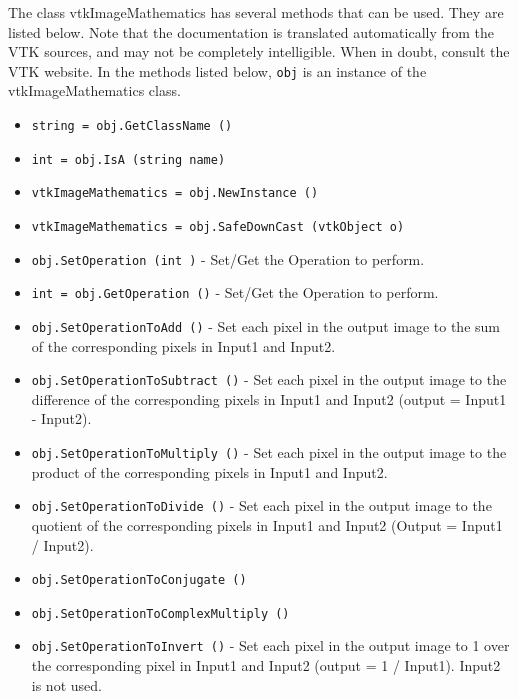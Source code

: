 The class vtkImageMathematics has several methods that can be used.
  They are listed below.
Note that the documentation is translated automatically from the VTK sources,
and may not be completely intelligible.  When in doubt, consult the VTK website.
In the methods listed below, \verb|obj| is an instance of the vtkImageMathematics class.
\begin{itemize}
\item  \verb|string = obj.GetClassName ()|

\item  \verb|int = obj.IsA (string name)|

\item  \verb|vtkImageMathematics = obj.NewInstance ()|

\item  \verb|vtkImageMathematics = obj.SafeDownCast (vtkObject o)|

\item  \verb|obj.SetOperation (int )| -  Set/Get the Operation to perform.

\item  \verb|int = obj.GetOperation ()| -  Set/Get the Operation to perform.

\item  \verb|obj.SetOperationToAdd ()| -  Set each pixel in the output image to the sum of the corresponding pixels
 in Input1 and Input2.

\item  \verb|obj.SetOperationToSubtract ()| -  Set each pixel in the output image to the difference of the corresponding pixels
 in Input1 and Input2 (output = Input1 - Input2).

\item  \verb|obj.SetOperationToMultiply ()| -  Set each pixel in the output image to the product of the corresponding pixels
 in Input1 and Input2.

\item  \verb|obj.SetOperationToDivide ()| -  Set each pixel in the output image to the quotient of the corresponding pixels
 in Input1 and Input2 (Output = Input1 / Input2).

\item  \verb|obj.SetOperationToConjugate ()|

\item  \verb|obj.SetOperationToComplexMultiply ()|

\item  \verb|obj.SetOperationToInvert ()| -  Set each pixel in the output image to 1 over the corresponding pixel
 in Input1 and Input2 (output = 1 / Input1). Input2 is not used.


\end{itemize}
